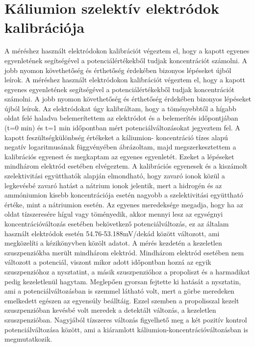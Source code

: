 \section{Káliumion szelektív elektródok kalibrációja}
A méréshez használt elektródokon kalibrációt végeztem el, hogy a kapott egyenes egyenletének segítségével a potenciálértékekből tudjak koncentrációt számolni. A jobb nyomon követhetőség és érthetőség érdekében bizonyos lépéseket újból leírok.
A méréshez használt elektródokon kalibrációt végeztem el, hogy a kapott egyenes egyenletének segítségével a potenciálértékekből tudjak koncentrációt számolni. A jobb nyomon követhetőség és érthetőség érdekében bizonyos lépéseket újból leírok. Az elektródokat úgy kalibráltam, hogy a töményebbtől a hígabb oldat felé haladva belemerítettem az elektródot és a belemerítés időpontjában (t=0 min) és t=1 min időpontban mért potenciálváltozásokat jegyeztem fel. A kapott feszültségkülönbség értékeket a káliumion- koncentráció tízes alapú negatív logaritmusának függvényében ábrázoltam, majd megszerkesztettem a kalibrációs egyenest és megkaptam az egyenes egyenletét. Ezeket a lépéseket mindhárom elektród esetében elvégeztem.
A kalibrációs egyenesek és a kiszámolt szelektivitási együtthatók alapján elmondható, hogy zavaró ionok közül a legkevésbé zavaró hatást a nátrium ionok jelentik, mert a hidrogén és az ammóniumion kisebb koncentrációja esetén nagyobb a szelektivitási együttható értéke, mint a nátriumion esetén.  Az egyenes meredeksége megadja, hogy ha az oldat tízszeresére hígul vagy töményedik, akkor mennyi lesz az egységnyi koncentrációváltozás esetében bekövetkező potenciálváltozás, ez az általam használt elektródok esetén 54.76-53.188mV/dekád között változott, ami megközelíti a kézikönyvben közölt adatot. A mérés kezdetén a kezeletlen szuszpenziókba merült mindhárom elektród. Mindhárom elektród esetében nem változott a potenciál, viszont mikor adott időpontban hozzá az egyik szuszpenzióhoz a nysztatint, a másik szuszpenzióhoz a propoliszt és a harmadikat pedig kezeletlenül hagytam. Meglepően gyorsan fejtette ki hatását a nysztatin, ami a potenciálváltozásban is szemmel látható volt, mert a görbe meredeken emelkedett egészen az egyensúly beálltáig. Ezzel szemben a propolisszal kezelt szuszpenzióban kevésbé volt meredek a detektált változás, a kezeletlen szuszpenzióban. Nagyjából tízszeres változás figyelhető meg a két pozitív kontrol potenciálváltozása között, ami a kiáramlott káliumion-koncentrációváltozásban is megmutatkozik. 

